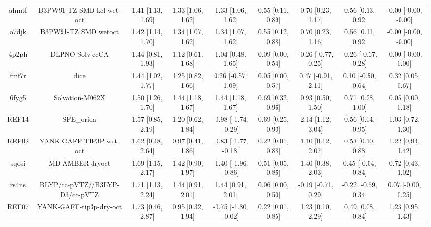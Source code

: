 \documentclass{article}
\begin{document}
\begin{center}
\begin{longtable}{|ccccccccc|}
 ahmtf &                          B3PW91-TZ SMD kcl-wet-oct &  1.41 [1.13, 1.69] &  1.33 [1.06, 1.62] &     1.33 [1.06, 1.62] &  0.55 [0.11, 0.89] &    0.70 [0.23, 1.17] &    0.56 [0.13, 0.92] &  -0.00 [-0.00, -0.00] \\
 o7djk &                               B3PW91-TZ SMD wetoct &  1.42 [1.14, 1.70] &  1.34 [1.07, 1.62] &     1.34 [1.07, 1.62] &  0.55 [0.12, 0.88] &    0.70 [0.23, 1.16] &    0.56 [0.11, 0.92] &  -0.00 [-0.00, -0.00] \\
 4p2ph &                                    DLPNO-Solv-ccCA &  1.44 [0.81, 1.93] &  1.12 [0.61, 1.68] &     1.04 [0.48, 1.65] &  0.09 [0.00, 0.54] &  -0.26 [-0.77, 0.25] &  -0.26 [-0.67, 0.28] &   -0.00 [-0.00, 0.00] \\
 fmf7r &                                               dice &  1.44 [1.02, 1.77] &  1.25 [0.82, 1.66] &    0.26 [-0.57, 1.09] &  0.05 [0.00, 0.57] &   0.47 [-0.91, 2.11] &   0.10 [-0.50, 0.64] &     0.32 [0.05, 0.67] \\
 6fyg5 &                                    Solvation-M062X &  1.50 [1.26, 1.70] &  1.44 [1.18, 1.67] &     1.44 [1.18, 1.67] &  0.69 [0.32, 0.96] &    0.93 [0.50, 1.50] &    0.71 [0.28, 1.00] &     0.05 [0.00, 0.18] \\
 REF14 &                                         SFE\_orion &  1.57 [0.85, 2.19] &  1.20 [0.62, 1.84] &  -0.98 [-1.74, -0.29] &  0.69 [0.25, 0.90] &    2.14 [1.12, 3.04] &    0.56 [0.04, 0.95] &     1.03 [0.72, 1.30] \\
 REF02 &                            YANK-GAFF-TIP3P-wet-oct &  1.62 [0.48, 2.64] &  0.97 [0.41, 1.86] &  -0.83 [-1.77, -0.18] &  0.22 [0.01, 0.88] &    1.10 [0.12, 2.07] &    0.53 [0.10, 0.88] &     1.22 [0.94, 1.42] \\
 sqosi &                                    MD-AMBER-dryoct &  1.69 [1.15, 2.17] &  1.42 [0.90, 1.97] &  -1.40 [-1.96, -0.86] &  0.51 [0.05, 0.86] &    1.40 [0.38, 2.03] &   0.45 [-0.04, 0.84] &     0.72 [0.43, 1.02] \\
 rs4ns &                     BLYP/cc-pVTZ//B3LYP-D3/cc-pVTZ &  1.71 [1.13, 2.24] &  1.44 [0.91, 2.01] &     1.44 [0.91, 2.01] &  0.06 [0.00, 0.50] &  -0.19 [-0.71, 0.29] &  -0.22 [-0.69, 0.34] &    0.07 [-0.00, 0.25] \\
 REF07 &                            YANK-GAFF-tip3p-dry-oct &  1.73 [0.46, 2.87] &  0.95 [0.32, 1.94] &  -0.75 [-1.80, -0.02] &  0.22 [0.01, 0.85] &    1.23 [0.10, 2.29] &    0.49 [0.08, 0.84] &     1.23 [0.95, 1.43] \\

\end{longtable}
\end{center}
\end{document}
